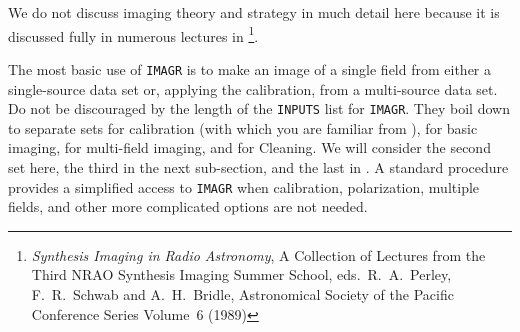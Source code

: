     We do not discuss imaging theory and strategy in much detail here
because it is discussed fully in numerous lectures in {\it
{}\/}\footnote{{\it Synthesis
Imaging in Radio Astronomy\/}, A Collection of Lectures from the Third
NRAO Synthesis Imaging Summer School,  eds.\ R.\ A.\ Perley, F.\ R.\
Schwab and A.\ H.\ Bridle, Astronomical Society of the Pacific
Conference Series Volume~6 (1989)}.


     The most basic use of {\tt IMAGR} is to make an image of a single
field from either a single-source data set or, applying the
calibration, from a multi-source data set.  Do not be discouraged by
the length of the {\tt INPUTS} list for {\tt IMAGR}\@.  They boil
down to separate sets for calibration (with which you are familiar
from \Rchap{cal}), for basic imaging, for multi-field imaging, and for
Cleaning.  We will consider the second set here, the third in the next
sub-section, and the last in \Sec{clean}.  A standard procedure {\tt
\Tndx{MAPPR}} provides a simplified access to {\tt IMAGR} when
calibration, polarization, multiple fields, and other more complicated
options are not needed.

